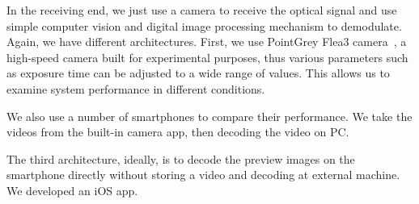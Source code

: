 In the receiving end, we just use a camera to receive the optical signal and use simple computer vision and digital image processing mechanism to demodulate. Again, we have different architectures.
First, we use PointGrey Flea3 camera~\cite{pointgrey_flea}, a high-speed camera built for experimental purposes, thus various parameters such as exposure time can be adjusted to a wide range of values. This allows us to examine system performance in different conditions. 

We also use a number of smartphones to compare their performance. We take the videos from the built-in camera app, then decoding the video on PC.

The third architecture, ideally, is to decode the preview images on the smartphone directly without storing a video and decoding at external machine. We developed an iOS app. 



